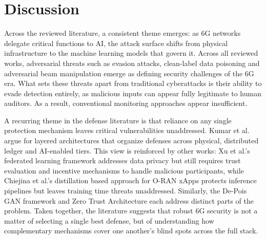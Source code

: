 \documentclass[letterpaper]{article} %
\begin{document}



\section{Discussion}


Across the reviewed literature, a consistent theme emerges: as 6G networks delegate critical functions to AI, the attack surface shifts from physical infrastructure to the machine learning models that govern it. Across all reviewed works, adversarial threats such as evasion attacks, clean-label data poisoning and adversarial beam manipulation emerge as defining security challenges of the 6G era. What sets these threats apart from traditional cyberattacks is their ability to evade detection entirely, as malicious inputs can appear fully legitimate to human auditors. As a result, conventional monitoring approaches appear insufficient.

A recurring theme in the defense literature is that reliance on any single protection mechanism leaves critical vulnerabilities unaddressed. Kumar et al. argue for layered architectures that organize defenses across physical, distributed ledger and AI-enabled tiers. This view is reinforced by other works: Xu et al.'s federated learning framework addresses data privacy but still requires trust evaluation and incentive mechanisms to handle malicious participants, while Chiejina et al.'s distillation based approach for O-RAN xApps protects inference pipelines but leaves training time threats unaddressed. Similarly, the De-Pois GAN framework and Zero Trust Architecture each address distinct parts of the problem. Taken together, the literature suggests that robust 6G security is not a matter of selecting a single best defense, but of understanding how complementary mechanisms cover one another's blind spots across the full stack.
\end{document}
